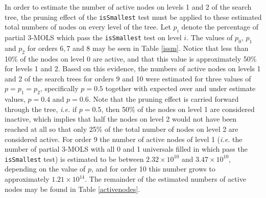 \documentclass[11pt, a4paper]{article}
\newcommand{\iis}{\texttt{isSmallest} }
\newcounter{ls}
\begin{document}
In order to   estimate the number of active nodes on levels 1 and 2 of the search tree, the pruning effect of the \texttt{isSmallest} test must be applied to these estimated total numbers of nodes on every level of the tree. Let $p_i$ denote the percentage of partial $3$-MOLS which pass the \iis test on level $i$. The values of $p_0, \, p_1$ and $p_2$ for orders $6,7$ and 8 may be seen in Table \ref{issm}. Notice that less than 10\% of the  nodes on level 0 are active, and that this value is approximately 50\% for levels 1 and 2. Based on this evidence, the numbers of active nodes on levels 1 and 2 of the search trees for orders 9 and 10 were estimated for three values of $p=p_1=p_2$, specifically $p=0.5$ together with  expected over and under estimate values, $p=0.4$ and $p =0.6$. Note that the pruning effect is carried forward through the tree, \emph{i.e.} if $p=0.5$, then 50\% of  the nodes on level 1 are considered inactive, which implies that half the nodes on level 2 would not have been reached at all so that only 25\% of the total number of nodes on level 2 are considered active.   For order 9 the number of active nodes of level 1 (\emph{i.e.} the number of partial $3$-MOLS with all 0 and 1 universals filled in which pass  the \iis test) is estimated to be between $2.32\times 10^{10}$ and $3.47\times 10^{10}$, depending on the value of $p$, and for order 10 this number grows to approximately $1.21\times 10^{14}$.  The remainder of the estimated numbers of active nodes  may be found in Table \ref{activenodes}. 
\end{document}
